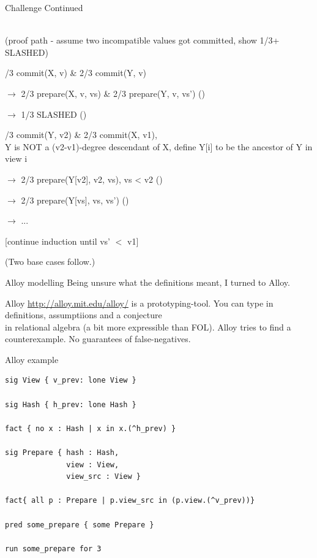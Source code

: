 \documentclass{beamer}
\begin{document}
\begin{frame}{Challenge Continued}

  \\ (proof path - assume two incompatible values got committed, show 1/3+ SLASHED)


/3 commit(X, v) \& 2/3 commit(Y, v)

$\rightarrow$ 2/3 prepare(X, v, vs) \& 2/3 prepare(Y, v, vs')  ()

$\rightarrow$ 1/3 SLASHED ()


/3 commit(Y, v2) \& 2/3 commit(X, v1),\\ Y is NOT a (v2-v1)-degree descendant of X, define Y[i] to be the ancestor of Y in view i

$\rightarrow$ 2/3 prepare(Y[v2], v2, vs), vs < v2 ()

$\rightarrow$ 2/3 prepare(Y[vs], vs, vs') ()

$\rightarrow$ ...

[continue induction until vs' $<$ v1]

(Two base cases follow.)

\end{frame}

\begin{frame}{Alloy modelling}
Being unsure what the definitions meant, I turned to Alloy.

Alloy \url{http://alloy.mit.edu/alloy/} is a prototyping-tool.
\vfill
You can type in definitions, assumptiions and a conjecture \\
in relational algebra (a bit more expressible than FOL).
\vfill
Alloy tries to find a counterexample.  No guarantees of false-negatives.
\end{frame}

\begin{frame}[fragile]{Alloy example}

\begin{verbatim}
sig View { v_prev: lone View }

sig Hash { h_prev: lone Hash }

fact { no x : Hash | x in x.(^h_prev) }

sig Prepare { hash : Hash,
              view : View,
              view_src : View }

fact{ all p : Prepare | p.view_src in (p.view.(^v_prev))}

pred some_prepare { some Prepare }

run some_prepare for 3
\end{verbatim}

\end{frame}
\end{document}

